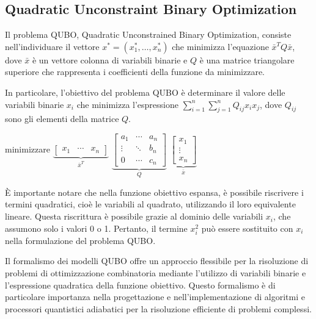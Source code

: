 \documentclass{article}
\begin{document}
\subsection{Quadratic Unconstraint Binary Optimization}
Il problema QUBO, Quadratic Unconstrained Binary Optimization\cite{DBLP:journals/corr/abs-1811-11538}, consiste nell'individuare il vettore $x^* = (x_1^*, \dots, x_n^*)$ che minimizza l'equazione $\bar{x}^TQ\bar{x}$, dove $\bar{x}$ è un vettore colonna di variabili binarie e $Q$ è una matrice triangolare superiore che rappresenta i coefficienti della funzione da minimizzare.

In particolare, l'obiettivo del problema QUBO è determinare il valore delle variabili binarie $x_i$ che minimizza l'espressione $\sum_{i=1}^{n} \sum_{j=1}^{n} Q_{ij} x_i x_j$, dove $Q_{ij}$ sono gli elementi della matrice $Q$.

\begin{center}
    minimizzare 
    $\underbrace{\begin{bmatrix}
        x_1 & \cdots & x_n 
    \end{bmatrix}}_{\bar{x}^T}$ 
    $\underbrace{\begin{bmatrix}
        a_1 & \cdots & a_n \\
        \vdots & \ddots & b_n \\
        0 & \cdots & c_n 
    \end{bmatrix}}_{Q}$ 
    $\underbrace{\begin{bmatrix}
        x_1 \\
        \vdots \\
        x_n 
    \end{bmatrix}}_{\bar{x}}$       
\end{center}

È importante notare che nella funzione obiettivo espansa, è possibile riscrivere i termini quadratici, cioè le variabili al quadrato, utilizzando il loro equivalente lineare. Questa riscrittura è possibile grazie al dominio delle variabili $x_i$, che assumono solo i valori 0 o 1. Pertanto, il termine $x_i^2$ può essere sostituito con $x_i$ nella formulazione del problema QUBO.

Il formalismo dei modelli QUBO offre un approccio flessibile per la risoluzione di problemi di ottimizzazione combinatoria mediante l'utilizzo di variabili binarie e l'espressione quadratica della funzione obiettivo. Questo formalismo è di particolare importanza nella progettazione e nell'implementazione di algoritmi e processori quantistici adiabatici per la risoluzione efficiente di problemi complessi.
\end{document}
